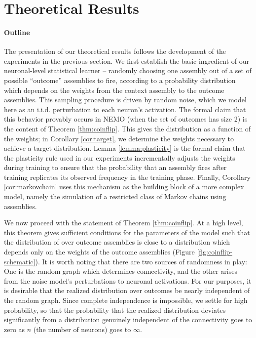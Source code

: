 \documentclass{article}
\theoremstyle{remark}
\newcommand{\1}{\mathbbm{1}}
\begin{document}
\section{Theoretical Results}

\paragraph{Outline} The presentation of our theoretical results follows the development of the experiments in the previous section. We first establish the basic ingredient of our neuronal-level statistical learner -- randomly choosing one assembly out of a set of possible ``outcome'' assemblies to fire, according to a probability distribution which depends on the weights from the context assembly to the outcome assemblies. This sampling procedure is driven by random noise, which we model here as an i.i.d. perturbation to each neuron's activation. The formal claim that this behavior provably occurs in NEMO (when the set of outcomes has size 2) is the content of Theorem \ref{thm:coinflip}. This gives the distribution as a function of the weights; in Corollary \ref{cor:target}, we determine the weights necessary to achieve a target distribution. Lemma \ref{lemma:plasticity} is the formal claim that the plasticity rule used in our experiments incrementally adjusts the weights during training to ensure that the probability that an assembly fires after training replicates its observed frequency in the training phase. Finally, Corollary \ref{cor:markovchain} uses this mechanism as the building block of a more complex model, namely the simulation of a restricted class of Markov chains using assemblies.

We now proceed with the statement of Theorem \ref{thm:coinflip}. At a high level, this theorem gives sufficient conditions for the parameters of the model such that the distribution of over outcome assemblies is close to a distribution which depends only on the weights of the outcome assemblies (Figure \ref{fig:coinflip-schematic}). It is worth noting that there are two sources of randomness in play: One is the random graph which determines connectivity, and the other arises from the noise model's perturbations to neuronal activations. For our purposes, it is desirable that the realized distribution over outcomes be nearly independent of the random graph. Since complete independence is impossible, we settle for high probability, so that the probability that the realized distribution deviates significantly from a distribution genuinely independent of the connectivity goes to zero as $n$ (the number of neurons) goes to $\infty$.
\end{document}
